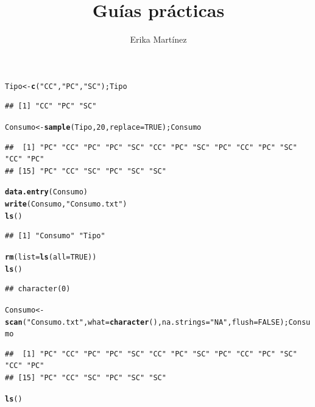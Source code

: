 \documentclass[10pt,a4paper]{article}\usepackage[]{graphicx}\usepackage[]{color}
\author{Erika Martínez}
\title{Guías prácticas}
\makeatletter
\newcommand{\hlnum}[1]{\textcolor[rgb]{0.686,0.059,0.569}{#1}}%
\newcommand{\hlstr}[1]{\textcolor[rgb]{0.192,0.494,0.8}{#1}}%
\newcommand{\hlstd}[1]{\textcolor[rgb]{0.345,0.345,0.345}{#1}}%
\newcommand{\hlkwb}[1]{\textcolor[rgb]{0.69,0.353,0.396}{#1}}%
\newcommand{\hlkwc}[1]{\textcolor[rgb]{0.333,0.667,0.333}{#1}}%
\newcommand{\hlkwd}[1]{\textcolor[rgb]{0.737,0.353,0.396}{\textbf{#1}}}%
\newenvironment{kframe}{%
 \def\at@end@of@kframe{}%
 \ifinner\ifhmode%
  \def\at@end@of@kframe{\end{minipage}}%
  \begin{minipage}{\columnwidth}%
 \fi\fi%
 \def\FrameCommand##1{\hskip\@totalleftmargin \hskip-\fboxsep
 \colorbox{shadecolor}{##1}\hskip-\fboxsep
     \hskip-\linewidth \hskip-\@totalleftmargin \hskip\columnwidth}%
 \MakeFramed {\advance\hsize-\width
   \@totalleftmargin\z@ \linewidth\hsize
   \@setminipage}}%
 {\par\unskip\endMakeFramed%
 \at@end@of@kframe}
\newenvironment{knitrout}{}{} %
\makeatother
\begin{document}
\maketitle
\newpage

\begin{knitrout}
\color{fgcolor}\begin{kframe}
\begin{alltt}
\hlstd{Tipo} \hlkwb{<-} \hlkwd{c}\hlstd{(}\hlstr{"CC"}\hlstd{,} \hlstr{"PC"}\hlstd{,} \hlstr{"SC"}\hlstd{); Tipo}
\end{alltt}
\begin{verbatim}
## [1] "CC" "PC" "SC"
\end{verbatim}
\begin{alltt}
\hlstd{Consumo} \hlkwb{<-} \hlkwd{sample}\hlstd{(Tipo,} \hlnum{20}\hlstd{,} \hlkwc{replace}\hlstd{=}\hlnum{TRUE}\hlstd{); Consumo}
\end{alltt}
\begin{verbatim}
##  [1] "PC" "CC" "PC" "PC" "SC" "CC" "PC" "SC" "PC" "CC" "PC" "SC" "CC" "PC"
## [15] "PC" "CC" "SC" "PC" "SC" "SC"
\end{verbatim}
\begin{alltt}
\hlkwd{data.entry}\hlstd{(Consumo)}
\hlkwd{write}\hlstd{(Consumo,} \hlstr{"Consumo.txt"}\hlstd{)}
\hlkwd{ls}\hlstd{()}
\end{alltt}
\begin{verbatim}
## [1] "Consumo" "Tipo"
\end{verbatim}
\begin{alltt}
\hlkwd{rm}\hlstd{(}\hlkwc{list}\hlstd{=}\hlkwd{ls}\hlstd{(}\hlkwc{all}\hlstd{=}\hlnum{TRUE}\hlstd{))}
\hlkwd{ls}\hlstd{()}
\end{alltt}
\begin{verbatim}
## character(0)
\end{verbatim}
\begin{alltt}
\hlstd{Consumo} \hlkwb{<-} \hlkwd{scan}\hlstd{(}\hlstr{"Consumo.txt"}\hlstd{,} \hlkwc{what} \hlstd{=} \hlkwd{character}\hlstd{(),} \hlkwc{na.strings} \hlstd{=} \hlstr{"NA"}\hlstd{,} \hlkwc{flush}\hlstd{=}\hlnum{FALSE}\hlstd{);Consumo}
\end{alltt}
\begin{verbatim}
##  [1] "PC" "CC" "PC" "PC" "SC" "CC" "PC" "SC" "PC" "CC" "PC" "SC" "CC" "PC"
## [15] "PC" "CC" "SC" "PC" "SC" "SC"
\end{verbatim}
\begin{alltt}
\hlkwd{ls}\hlstd{()}
\end{alltt}

\end{kframe}
\end{knitrout}
\end{document}
